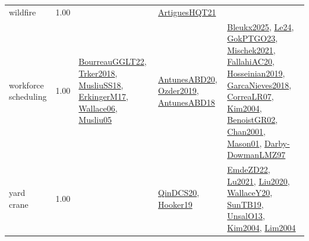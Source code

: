 {\begin{longtable}{p{3cm}r>{\raggedright\arraybackslash}p{6cm}>{\raggedright\arraybackslash}p{6cm}>{\raggedright\arraybackslash}p{8cm}}
\index{wildfire}\index{ApplicationAreas!wildfire}wildfire &  1.00 &  & \hyperref[detail:ArtiguesHQT21]{ArtiguesHQT21} & \\
\index{workforce scheduling}\index{ApplicationAreas!workforce scheduling}workforce scheduling &  1.00 & \hyperref[detail:BourreauGGLT22]{BourreauGGLT22}, \hyperref[detail:Trker2018]{Trker2018}, \hyperref[detail:MusliuSS18]{MusliuSS18}, \hyperref[detail:ErkingerM17]{ErkingerM17}, \hyperref[detail:Wallace06]{Wallace06}, \hyperref[detail:Musliu05]{Musliu05} & \hyperref[detail:AntunesABD20]{AntunesABD20}, \hyperref[detail:Ozder2019]{Ozder2019}, \hyperref[detail:AntunesABD18]{AntunesABD18} & \hyperref[detail:Bleukx2025]{Bleukx2025}, \hyperref[detail:Le24]{Le24}, \hyperref[detail:GokPTGO23]{GokPTGO23}, \hyperref[detail:Mischek2021]{Mischek2021}, \hyperref[detail:FallahiAC20]{FallahiAC20}, \hyperref[detail:Hosseinian2019]{Hosseinian2019}, \hyperref[detail:GarcaNieves2018]{GarcaNieves2018}, \hyperref[detail:CorreaLR07]{CorreaLR07}, \hyperref[detail:Kim2004]{Kim2004}, \hyperref[detail:BenoistGR02]{BenoistGR02}, \hyperref[detail:Chan2001]{Chan2001}, \hyperref[detail:Mason01]{Mason01}, \hyperref[detail:Darby-DowmanLMZ97]{Darby-DowmanLMZ97}\\
\index{yard crane}\index{ApplicationAreas!yard crane}yard crane &  1.00 &  & \hyperref[detail:QinDCS20]{QinDCS20}, \hyperref[detail:Hooker19]{Hooker19} & \hyperref[detail:EmdeZD22]{EmdeZD22}, \hyperref[detail:Lu2021]{Lu2021}, \hyperref[detail:Liu2020]{Liu2020}, \hyperref[detail:WallaceY20]{WallaceY20}, \hyperref[detail:SunTB19]{SunTB19}, \hyperref[detail:UnsalO13]{UnsalO13}, \hyperref[detail:Kim2004]{Kim2004}, \hyperref[detail:Lim2004]{Lim2004}\\
\end{longtable}
}

\clearpage
